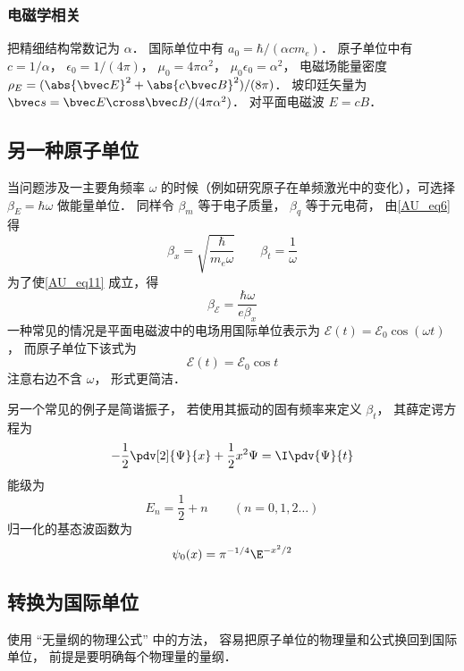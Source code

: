 \subsubsection{电磁学相关}
把精细结构常数记为 $\alpha$． 国际单位中有 $a_0 = \hbar/(\alpha c m_e)$． 原子单位中有 $c = 1/\alpha$， $\epsilon_0 = 1/(4\pi)$， $\mu_0 = 4\pi\alpha^2$， $\mu_0\epsilon_0 = \alpha^2$， 电磁场能量密度 $\rho_E = (\abs{\bvec E}^2  + \abs{c\bvec B}^2)/(8\pi)$． 坡印廷矢量为 $\bvec s = \bvec E \cross \bvec B/(4\pi\alpha^2)$． 对平面电磁波 $E = cB$．  

\subsection{另一种原子单位}

当问题涉及一主要角频率 $\omega$ 的时候（例如研究原子在单频激光中的变化），可选择 $\beta_E = \hbar\omega$ 做能量单位． 同样令 $\beta_m$ 等于电子质量， $\beta_q$ 等于元电荷， 由\autoref{AU_eq6} 得
\begin{equation}\label{AU_eq15}
\beta_x = \sqrt{\frac{\hbar}{m_e\omega}}
\qquad
\beta_t = \frac{1}{\omega}
\end{equation}
为了使\autoref{AU_eq11} 成立，得
\begin{equation}
\beta_\mathcal{E} = \frac{\hbar\omega}{e \beta_x}
\end{equation}
一种常见的情况是平面电磁波中的电场用国际单位表示为 $\mathcal{E}(t) = \mathcal{E}_0\cos(\omega t)$， 而原子单位下该式为
\begin{equation}
\mathcal{E}(t) = \mathcal{E}_0\cos t
\end{equation}
注意右边不含 $\omega$， 形式更简洁．

另一个常见的例子是简谐振子， 若使用其振动的固有频率来定义 $\beta_t$， 其薛定谔方程为
\begin{equation}\label{AU_eq18}
-\frac12 \pdv[2]{\Psi}{x} + \frac12 x^2 \Psi= \I\pdv{\Psi}{t}
\end{equation}
能级为
\begin{equation}\label{AU_eq19}
E_n = \frac12 + n \qquad (n = 0, 1, 2\dots)
\end{equation}
归一化的基态波函数为
\begin{equation}
\psi_0(x) = \pi^{-1/4} \E^{-x^2/2}
\end{equation}

\subsection{转换为国际单位}
使用 “无量纲的物理公式” 中的方法， 容易把原子单位的物理量和公式换回到国际单位， 前提是要明确每个物理量的量纲．


